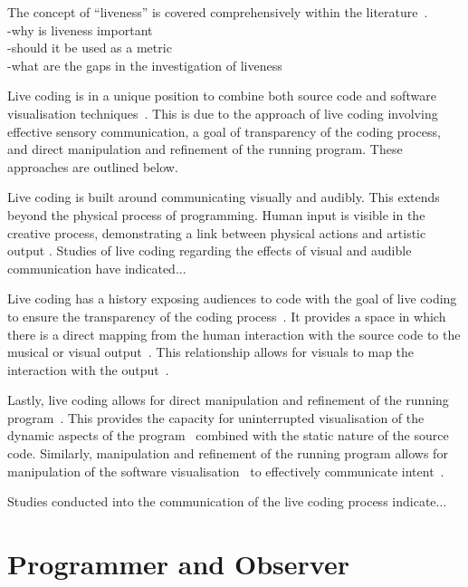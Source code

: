 
The concept of ``liveness'' is covered comprehensively within the literature~\cite{Auslander,Masura2007}.\\
-why is liveness important\\
-should it be used as a metric\\
-what are the gaps in the investigation of liveness

Live coding is in a unique position to combine both source code and software visualisation techniques~\cite{McLean2010a}. This is due to the approach of live coding involving effective sensory communication, a goal of transparency of the coding process, and direct manipulation and refinement of the running program. These approaches are outlined below.

Live coding is built around communicating visually and audibly. This extends beyond the physical process of programming. Human input is visible in the creative process, demonstrating a link between physical actions and artistic output \cite{Mclean}. Studies of live coding regarding the effects of visual and audible communication have indicated...

Live coding has a history exposing audiences to code with the goal of live coding to ensure the transparency of the coding process~\cite{Collins2011,McLean2010a}. It provides a space in which there is a direct mapping from the human interaction with the source code to the musical or visual output~\cite{Mclean}. This relationship allows for visuals to map the interaction with the output~.

Lastly, live coding allows for direct manipulation and refinement of the running program~\cite{Swift2013}. This provides the capacity for uninterrupted visualisation of the dynamic aspects of the program~ combined with the static nature of the source code. Similarly, manipulation and refinement of the running program allows for manipulation of the software visualisation~\cite{McLean2010a} to effectively communicate intent~.

Studies conducted into the communication of the live coding process indicate...

\section{Programmer and Observer}

